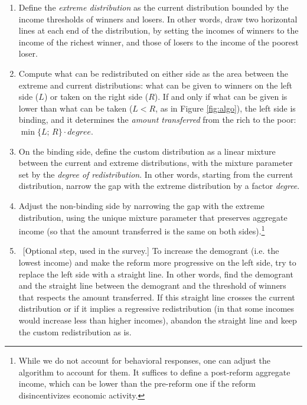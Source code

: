 \begin{enumerate}
    \item Define the \textit{extreme distribution} as the current distribution bounded by the income thresholds of winners and losers. In other words, draw two horizontal lines at each end of the distribution, by setting the incomes of winners to the income of the richest winner, and those of losers to the income of the poorest loser.
    \item Compute what can be redistributed on either side as the area between the extreme and current distributions: what can be given to winners on the left side ($L$) or taken on the right side ($R$). If and only if what can be given is lower than what can be taken ($L < R$, as in Figure \ref{fig:algo}), the left side is binding, and it determines the \textit{amount transferred} from the rich to the poor: $\min\{L;\,R\} \cdot degree$.
    \item On the binding side, define the custom distribution as a linear mixture between the current and extreme distributions, with the mixture parameter set by the \textit{degree of redistribution}. In other words, starting from the current distribution, narrow the gap with the extreme distribution by a factor \textit{degree}.
    \item Adjust the non-binding side by narrowing the gap with the extreme distribution, using the unique mixture parameter that preserves aggregate income (so that the amount transferred is the same on both sides).\footnote{While we do not account for behavioral responses, one can adjust the algorithm to account for them. It suffices to define a post-reform aggregate income, which can be lower than the pre-reform one if the reform disincentivizes economic activity.}
    \item ~[Optional step, used in the survey.] To increase the demogrant (i.e. the lowest income) and make the reform more progressive on the left side, try to replace the left side with a straight line. In other words, find the demogrant and the straight line between the demogrant and the threshold of winners that respects the amount transferred. If this straight line crosses the current distribution or if it implies a regressive redistribution (in that some incomes would increase less than higher incomes), abandon the straight line and keep the custom redistribution as is.
\end{enumerate}

